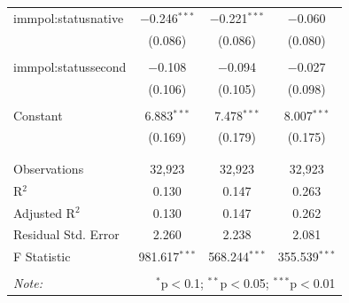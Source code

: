 \begin{table}[!htbp]
\begin{tabular}{@{\extracolsep{5pt}}lccc}
 immpol:statusnative & $-$0.246$^{***}$ & $-$0.221$^{***}$ & $-$0.060 \\ 
  & (0.086) & (0.086) & (0.080) \\ 
  & & & \\ 
 immpol:statussecond & $-$0.108 & $-$0.094 & $-$0.027 \\ 
  & (0.106) & (0.105) & (0.098) \\ 
  & & & \\ 
 Constant & 6.883$^{***}$ & 7.478$^{***}$ & 8.007$^{***}$ \\ 
  & (0.169) & (0.179) & (0.175) \\ 
  & & & \\ 
\hline \\[-1.8ex] 
Observations & 32,923 & 32,923 & 32,923 \\ 
R$^{2}$ & 0.130 & 0.147 & 0.263 \\ 
Adjusted R$^{2}$ & 0.130 & 0.147 & 0.262 \\ 
Residual Std. Error & 2.260 & 2.238 & 2.081 \\ 
F Statistic & 981.617$^{***}$ & 568.244$^{***}$ & 355.539$^{***}$ \\ 
\hline 
\hline \\[-1.8ex] 
\textit{Note:}  & \multicolumn{3}{r}{$^{*}$p$<$0.1; $^{**}$p$<$0.05; $^{***}$p$<$0.01} \\ 
\end{tabular} 
\end{table} 
